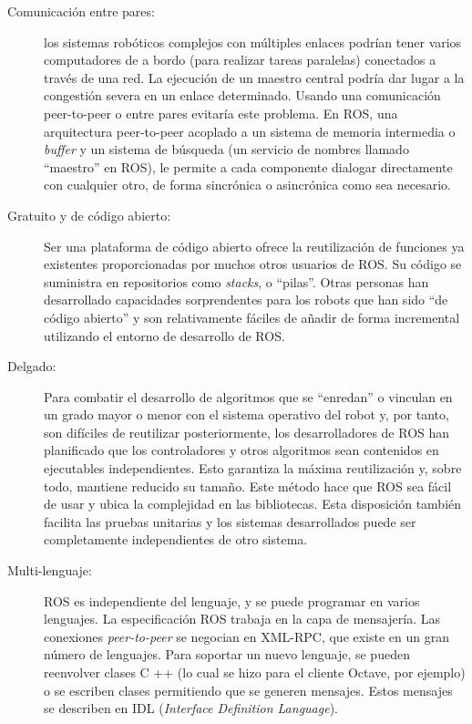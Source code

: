 \begin{description}
	\item[Comunicación entre pares:] los sistemas robóticos complejos con múltiples enlaces podrían tener varios computadores de a bordo (para realizar tareas paralelas) conectados a través de una red. La ejecución de un maestro central podría dar lugar a la congestión severa en un enlace determinado. Usando una comunicación peer-to-peer o entre pares evitaría este problema. En ROS, una arquitectura peer-to-peer acoplado a un sistema de memoria intermedia o \textit{buffer} y un sistema de búsqueda (un servicio de nombres llamado ``maestro'' en ROS), le permite a cada componente dialogar directamente con cualquier otro, de forma sincrónica o asincrónica como sea necesario.

	\item[Gratuito y de código abierto:] Ser una plataforma de código abierto ofrece la reutilización de funciones ya existentes proporcionadas por muchos otros usuarios de ROS. Su código se suministra en repositorios como \textit{stacks}, o ``pilas''. Otras personas han desarrollado capacidades sorprendentes para los robots que han sido ``de código abierto'' y son relativamente fáciles de añadir de forma incremental utilizando el entorno de desarrollo de ROS.

	\item[Delgado:] Para combatir el desarrollo de algoritmos que se ``enredan'' o vinculan en un grado mayor o menor con el sistema operativo del robot y, por tanto, son difíciles de reutilizar posteriormente, los desarrolladores de ROS han planificado que los controladores y otros algoritmos sean contenidos en ejecutables independientes. Esto garantiza la máxima reutilización y, sobre todo, mantiene reducido su tamaño. Este método hace que ROS sea fácil de usar y ubica la complejidad en las bibliotecas. Esta disposición también facilita las pruebas unitarias y los sistemas desarrollados puede ser completamente independientes de otro sistema.

	\item[Multi-lenguaje:] ROS es independiente del lenguaje, y se puede programar en varios lenguajes. La especificación ROS trabaja en la capa de mensajería. Las conexiones \textit{peer-to-peer} se negocian en XML-RPC, que existe en un gran número de lenguajes. Para soportar un nuevo lenguaje, se pueden reenvolver clases C ++ (lo cual se hizo para el cliente Octave, por ejemplo) o se escriben clases permitiendo que se generen mensajes. Estos mensajes se describen en IDL (\textit{Interface Definition Language}). \cite{quigley2009ros}
\end{description}

